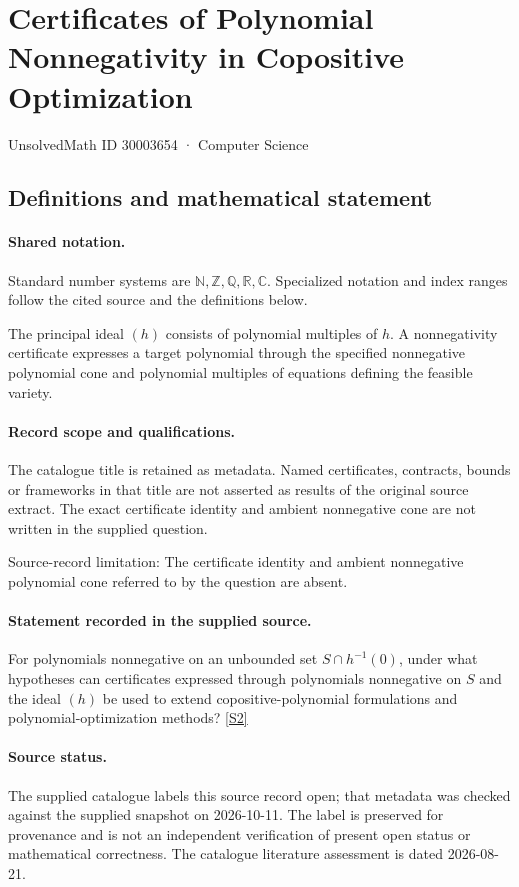 \documentclass[11pt]{article}
\newcommand{\sref}[2]{\hyperlink{source:#1:#2}{[S#2]}}
\begin{document}
\setcounter{section}{30003653}
\section{Certificates of Polynomial Nonnegativity in Copositive Optimization}\label{30003654}
{\small\sffamily UnsolvedMath ID 30003654 · Computer Science}
\subsection{Definitions and mathematical statement}

\paragraph{Shared notation.}Standard number systems are $\mathbb N,\mathbb Z,\mathbb Q,\mathbb R,\mathbb C$. Specialized notation and index ranges follow the cited source and the definitions below.


The principal ideal $(h)$ consists of polynomial multiples of $h$. A nonnegativity certificate expresses a target polynomial through the specified nonnegative polynomial cone and polynomial multiples of equations defining the feasible variety.
\paragraph{Record scope and qualifications.}
The catalogue title is retained as metadata. Named certificates, contracts, bounds or frameworks in that title are not asserted as results of the original source extract.
The exact certificate identity and ambient nonnegative cone are not written in the supplied question.

Source-record limitation: The certificate identity and ambient nonnegative polynomial cone referred to by the question are absent.
\paragraph{Statement recorded in the supplied source.}
For polynomials nonnegative on an unbounded set $S\cap h^{-1}(0)$, under what hypotheses can certificates expressed through polynomials nonnegative on $S$ and the ideal $(h)$ be used to extend copositive-polynomial formulations and polynomial-optimization methods? \sref{30003654}{2}
\paragraph{Source status.}
The supplied catalogue labels this source record open; that metadata was checked against the supplied snapshot on 2026-10-11. The label is preserved for provenance and is not an independent verification of present open status or mathematical correctness. The catalogue literature assessment is dated 2026-08-21.
\end{document}
